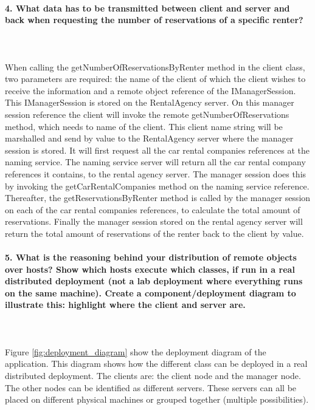 \documentclass{ds-report}
\begin{document}
	\paragraph{4. What data has to be transmitted between client and server and back when requesting the number of reservations of a specific renter?} \mbox{}\\\\
When calling the getNumberOfReservationsByRenter method in the client class, two parameters are required: the name of the client of which the client wishes to receive the information and a remote object reference of the IManagerSession. This IManagerSession is stored on the RentalAgency server. On this manager session reference the client will invoke the remote getNumberOfReservations method, which needs to name of the client. This client name string will be marshalled and send by value to the RentalAgency server where the manager session is stored. It will first request all the car rental companies references at the naming service. The naming service server will return all the car rental company references it contains, to the rental agency server. The manager session does this by invoking the getCarRentalCompanies method on the naming service reference.
Thereafter, the getReservationsByRenter method is called by the manager session on each of the car rental companies references, to calculate the total amount of reservations. Finally the manager session stored on the rental agency server will return the total amount of reservations of the renter back to the client by value.   

\clearpage
	\paragraph{5. What is the reasoning behind your distribution of remote objects over hosts? Show which hosts execute which classes, if run in a real distributed deployment (not a lab deployment where everything runs on the same machine). Create a component/deployment diagram to illustrate this: highlight where the client and server are.} \mbox{}\\\\

Figure \ref{fig:deployment_diagram} show the deployment diagram of the application. This diagram shows how the different class can be deployed in a real distributed deployment. The clients are: the client node and the manager node. The other nodes can be identified as different servers. These servers can all be placed on different physical machines or grouped together (multiple possibilities).
\end{document}
